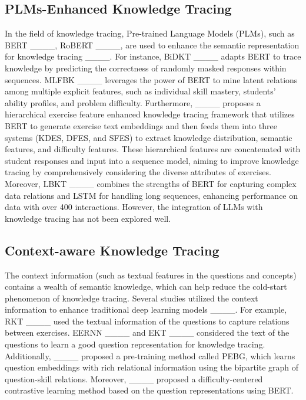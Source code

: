 \subsection{PLMs-Enhanced Knowledge Tracing}
In the field of knowledge tracing, Pre-trained Language Models (PLMs), such as BERT ____, RoBERT ____, are used to enhance the semantic representation for knowledge tracing ____. 
For instance, BiDKT ____ adapts BERT to trace knowledge by predicting the correctness of randomly masked responses within sequences.
MLFBK ____ leverages the power of BERT to mine latent relations among multiple explicit features, such as individual skill mastery, students' ability profiles, and problem difficulty.
Furthermore, ____ proposes a hierarchical exercise feature enhanced knowledge tracing framework that utilizes BERT to generate exercise text embeddings and then feeds them into three systems (KDES, DFES, and SFES) to extract knowledge distribution, semantic features, and difficulty features. These hierarchical features are concatenated with student responses and input into a sequence model, aiming to improve knowledge tracing by comprehensively considering the diverse attributes of exercises.
Moreover, LBKT ____ combines the strengths of BERT for capturing complex data relations and LSTM for handling long sequences, enhancing performance on data with over 400 interactions. 
However, the integration of LLMs with knowledge tracing has not been explored well.


\subsection{Context-aware Knowledge Tracing}
The context information (such as textual features in the questions and concepts) contains a wealth of semantic knowledge, which can help reduce the cold-start phenomenon of knowledge tracing. 
Several studies utilized the context information to enhance traditional deep learning models ____. 
For example, RKT ____ used the textual information of the questions to capture relations between exercises. 
EERNN ____ and EKT ____ considered the text of the questions to learn a good question representation for knowledge tracing. 
Additionally, ____ proposed a pre-training method called PEBG, which learns question embeddings with rich relational information using the bipartite graph of question-skill relations. 
Moreover, ____ proposed a difficulty-centered contrastive learning method based on the question representations using BERT. 


